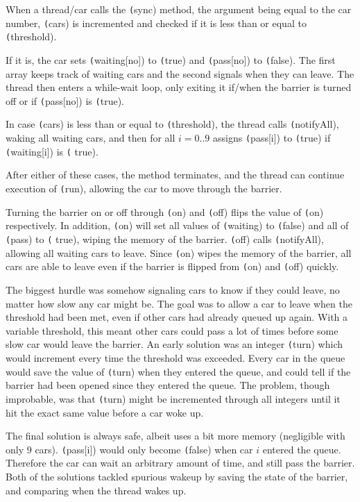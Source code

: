 When a thread/car calls the \texttt(sync) method, the argument being equal to the car number, \texttt(cars) is incremented and checked if it is less than or equal to \texttt(threshold).

If it is, the car sets \texttt(waiting[no]) to \texttt(true) and \texttt(pass[no]) to \texttt(false). The first array keeps track of waiting cars and the second signals when they can leave. The thread then enters a while-wait loop, only exiting it if/when the barrier is turned off or if \texttt(pass[no]) is \texttt(true).

In case \texttt(cars) is less than or equal to \texttt(threshold), the thread calls \texttt(notifyAll), waking all waiting cars, and then for all $i=0..9$ assigns \texttt(pass[i]) to \texttt(true) if \texttt(waiting[i]) is \texttt( true).

After either of these cases, the method terminates, and the thread can continue execution of \texttt(run), allowing the car to move through the barrier.

Turning the barrier on or off through \texttt(on) and \texttt(off) flips the value of \texttt(on) respectively. In addition, \texttt(on) will set all values of \texttt(waiting) to \texttt(false) and all of \texttt(pass) to \texttt( true), wiping the memory of the barrier. \texttt(off) calls \texttt(notifyAll), allowing all waiting cars to leave. Since \texttt(on) wipes the memory of the barrier, all cars are able to leave even if the barrier is flipped from \texttt(on) and \texttt(off) quickly.

The biggest hurdle was somehow signaling cars to know if they could leave, no matter how slow any car might be. The goal was to allow a car to leave when the threshold had been met, even if other cars had already queued up again. With a variable threshold, this meant other cars could pass a lot of times before some slow car would leave the barrier. An early solution was an integer \texttt(turn) which would increment every time the threshold was exceeded. Every car in the queue would save the value of \texttt(turn) when they entered the queue, and could tell if the barrier had been opened since they entered the queue. The problem, though improbable, was that \texttt(turn) might be incremented through all integers until it hit the exact same value before a car woke up.

The final solution is always safe, albeit uses a bit more memory (negligible with only $9$ cars). \texttt(pass[i]) would only become \texttt(false) when car $i$ entered the queue. Therefore the car can wait an arbitrary amount of time, and still pass the barrier. Both of the solutions tackled spurious wakeup by saving the state of the barrier, and comparing when the thread wakes up.


